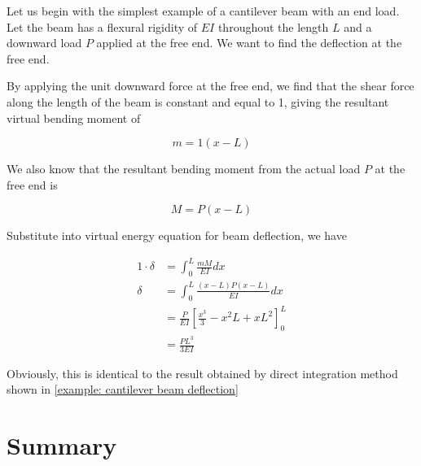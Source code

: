 \documentclass[
fontsize=10pt,
a4paper,
twosides=false,
open=any,
svgnames,
]{kaobook} %
\begin{document}
\begin{example}
  Let us begin with the simplest example of a cantilever beam with an end load. Let the beam has a flexural rigidity of $EI$ throughout the length $L$ and a downward load $P$ applied at the free end. We want to find the deflection at the free end.

  \centering

  By applying the unit downward force at the free end, we find that the shear force along the length of the beam is constant and equal to 1, giving the resultant virtual bending moment of

  \begin{equation*}
    m = 1(x - L)
  \end{equation*}

  We also know that the resultant bending moment from the actual load $P$ at the free end is

  \begin{equation*}
    M = P(x - L)
  \end{equation*}

  Substitute into virtual energy equation for beam deflection, we have

  \begin{align*}
    1 \cdot \delta &= \int_0^L \frac{mM}{EI} dx \\
    \delta &= \int_0^L \frac{(x-L)P(x-L)}{EI} dx \\
                   &= \frac{P}{EI} \left[ \frac{x^3}{3} - x^2L +  xL^2 \right]_0^L \\
                   &= \frac{PL^3}{3EI}
  \end{align*}

  Obviously, this is identical to the result obtained by direct integration method shown in \cref{example: cantilever beam deflection}
\end{example}

\section*{Summary}
\end{document}
